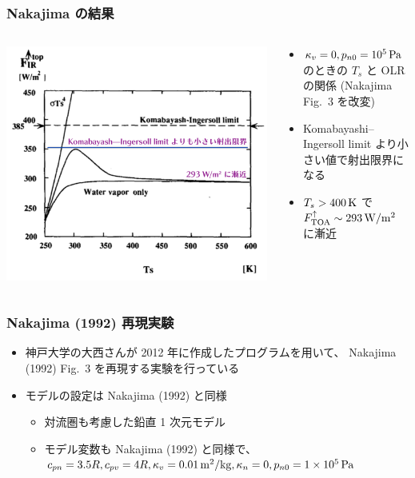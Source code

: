 \documentclass[aspectratio=149]{beamer}
\newcommand{\hmTOA}{\mathrm{TOA}}
\newcommand{\hme}[1]{\times10^{#1}}
\begin{document}
\begin{frame}
	\frametitle{Nakajima \etal の結果}
	\begin{columns}[c]
		\begin{column}{.6\textwidth}
			\centering
			\includegraphics[width=\textwidth]{nakajima3-cpp-crop.pdf}\\
		\end{column}
		\begin{column}{.4\textwidth}
			\small
			\begin{itemize}
			\item \(\kappa_v=0, p_{n0}=10^5\hmu{Pa}\) のときの \(T_s\) と OLR の関係
				(Nakajima \etal Fig.~3 を改変)
			\item Komabayashi--Ingersoll limit より小さい値で射出限界になる
			\item \(T_s>400\hmu{K}\) で \(F^\uparrow_\hmTOA\sim293\hmu{W/m^2}\) に漸近
		\end{itemize}
	\end{column}
\end{columns}
\end{frame}

\begin{frame}
	\frametitle{Nakajima \etal (1992) 再現実験}
	\begin{itemize}
		\item 神戸大学の大西さんが 2012 年に作成したプログラムを用いて、
			Nakajima \etal (1992) Fig.~3 を再現する実験を行っている
		\item モデルの設定は Nakajima \etal (1992) と同様
			\begin{itemize}
				\item 対流圏も考慮した鉛直 1 次元モデル
				\item モデル変数も Nakajima \etal (1992) と同様で、
					\(c_{pn}=3.5R, c_{pv}=4R, \kappa_v=0.01\hmu{m^2/kg}, \kappa_n=0, p_{n0}=1\hme{5}\hmu{Pa}\)
			\end{itemize}
	\end{itemize}
\end{frame}
\end{document}
